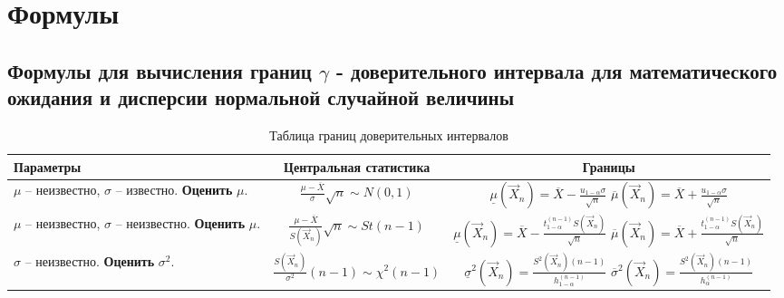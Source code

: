 \chapter{Формулы}

\section*{Формулы для вычисления границ $\gamma$ - доверительного интервала для математического ожидания и дисперсии нормальной случайной величины}

\begin{center}
\captionsetup{justification=raggedright,singlelinecheck=off}
	\begin{longtable}[c]{|l|c|c|}
	\caption{Таблица границ доверительных интервалов}
		\\ \hline
		Параметры & Центральная статистика & Границы 
		\\ \hline
        \makecell{
    		$\mu$ -- неизвестно,\\
    		$\sigma$ -- известно.\\ 
    		\textbf{Оценить} $\mu$.
        }
		& 
		$\frac{\mu - \overline{X}}{\sigma} \sqrt{n} \sim N(0,1)$
		& 
        \makecell{
    		$\underline\mu(\vec X_n) = \overline{X} - \frac{u_{1 - \alpha} \sigma}{\sqrt{n}}$\\
    		$\overline\mu(\vec X_n) = \overline{X} + \frac{u_{1 - \alpha} \sigma}{\sqrt{n}}$
        }
		\\ \hline
        \makecell{
    		$\mu$ -- неизвестно,\\ 
    		$\sigma$ -- неизвестно.\\ 
		    \textbf{Оценить} $\mu$.
        }
		&  
		$\frac{\mu - \overline{X}}{S(\vec X_n)} \sqrt{n} \sim St(n - 1)$
		& 
        \makecell{
    		$\underline\mu(\vec X_n) = \overline{X} - \frac{t^{(n - 1)}_{1 - \alpha} S(\vec X_n)}{\sqrt{n}}$\\
    		$\overline\mu(\vec X_n) = \overline{X} + \frac{t^{(n - 1)}_{1 - \alpha} S(\vec X_n)}{\sqrt{n}}$
        }
		\\ \hline
        \makecell{
    		$\sigma$ -- неизвестно.\\ 
    		\textbf{Оценить} $\sigma^2$.
        }
		&  
		\newline $\frac{S(\vec X_n)}{\sigma^2} (n - 1) \sim \chi^2 (n - 1)$
		&    
        \makecell{
    		$\underline\sigma^2(\vec X_n) = \frac{S^2(\vec X_n) (n - 1)}{h^{(n - 1)}_{1 - \alpha}}$\\
    		$\overline\sigma^2(\vec X_n) = \frac{S^2(\vec X_n) (n - 1)}{h^{(n - 1)}_{\alpha}}$
        }
	    \\ \hline
\end{longtable}
\end{center}

